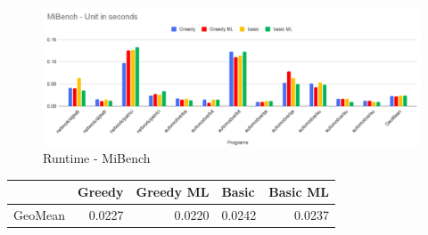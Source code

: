 \begin{figure}[t]
    \centering
    \includegraphics[scale=0.4]{figures/chapter-5/MiBench.png}
    \caption{Runtime - MiBench}
     \label{fig:mlra-mibench}
\end{figure}

\begin{table}[h]
\begin{tabular}{|l|l|l|l|l|}
\hline
 & \textbf{Greedy} & \textbf{Greedy ML} & \textbf{Basic} & \textbf{Basic ML} \\ \hline
GeoMean & \multicolumn{1}{r|}{0.0227} & \multicolumn{1}{r|}{0.0220} & \multicolumn{1}{r|}{0.0242} & \multicolumn{1}{r|}{0.0237} \\ \hline
\end{tabular}
\centering
\end{table}
